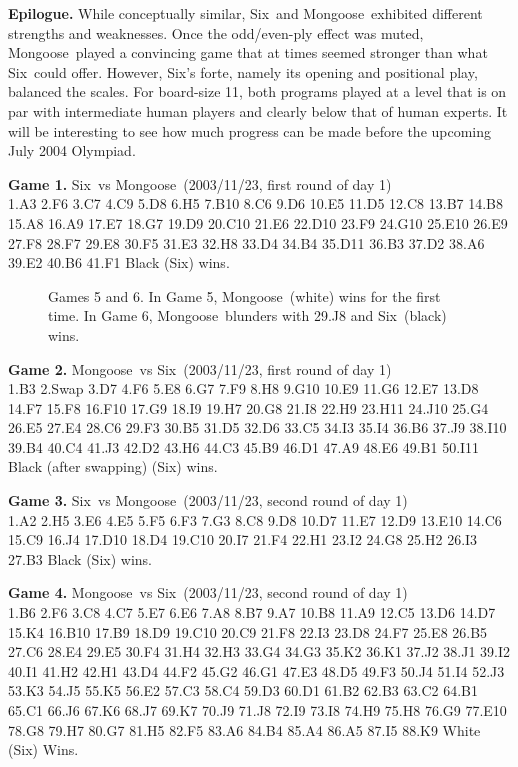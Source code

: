 \documentclass[12pt]{article}
\def\Six{{\sc Six}}
\def\Mg{{\sc Mongoose}}
\begin{document}
{\noindent\large\bf Epilogue.}
While conceptually similar, \Six\ and \Mg\ exhibited different
strengths and weaknesses. Once the odd/even-ply effect was muted,
\Mg\ played a convincing game that at times seemed stronger than what
\Six\ could offer. However, \Six's forte, 
namely its opening and positional play, balanced the scales. 
For board-size 11,
both programs played at a level that is on par with intermediate human players
and clearly below that of human experts.
It will be interesting to see how much progress can be made
before the upcoming July 2004 Olympiad.

{\footnotesize
\begin{trivlist}
\item[] 
{\bf Game 1.} \Six\ vs \Mg\ (2003/11/23, first round of day 1)\\
1.A3 2.F6 3.C7 4.C9 5.D8 6.H5 7.B10 8.C6 9.D6 10.E5
11.D5 12.C8 13.B7 14.B8 15.A8 16.A9 17.E7 18.G7 19.D9
20.C10 21.E6 22.D10 23.F9 24.G10 25.E10 26.E9 27.F8 28.F7
29.E8 30.F5 31.E3 32.H8 33.D4 34.B4 35.D11 36.B3 37.D2
38.A6 39.E2 40.B6 41.F1
Black (\Six) wins.

\begin{figure}\label{fig3}
\hspace*{-.2in}
\caption{Games 5 and 6.
In Game 5, \Mg\ (white) wins for the first time.
In Game 6, \Mg\ blunders with 29.J8 and \Six\ (black) wins.}
\end{figure}

\item[] {\bf Game 2.} \Mg\ vs \Six\ (2003/11/23, first round of day 1)\\
1.B3 2.Swap 3.D7 4.F6 5.E8 6.G7 7.F9 8.H8 9.G10 10.E9
11.G6 12.E7 13.D8 14.F7 15.F8 16.F10 17.G9 18.I9 19.H7
20.G8 21.I8 22.H9 23.H11 24.J10 25.G4 26.E5 27.E4 28.C6
29.F3 30.B5 31.D5 32.D6 33.C5 34.I3 35.I4 36.B6 37.J9
38.I10 39.B4 40.C4 41.J3 42.D2 43.H6 44.C3 45.B9 46.D1
47.A9 48.E6 49.B1 50.I11
Black (after swapping) (\Six) wins.

\item[] {\bf Game 3.} \Six\ vs \Mg\ (2003/11/23, second round of day 1)\\
1.A2 2.H5 3.E6 4.E5 5.F5 6.F3 7.G3 8.C8 9.D8 10.D7
11.E7 12.D9 13.E10 14.C6 15.C9 16.J4 17.D10 18.D4 19.C10
20.I7 21.F4 22.H1 23.I2 24.G8 25.H2 26.I3 27.B3
Black (\Six) wins.

\item[] {\bf Game 4.} \Mg\ vs \Six\ (2003/11/23, second round of day 1)\\
1.B6 2.F6 3.C8 4.C7 5.E7 6.E6 7.A8 8.B7 9.A7 10.B8
11.A9 12.C5 13.D6 14.D7 15.K4 16.B10 17.B9 18.D9 19.C10
20.C9 21.F8 22.I3 23.D8 24.F7 25.E8 26.B5 27.C6 28.E4 29.E5
30.F4 31.H4 32.H3 33.G4 34.G3 35.K2 36.K1 37.J2 38.J1 39.I2
40.I1 41.H2 42.H1 43.D4 44.F2 45.G2 46.G1 47.E3 48.D5 49.F3
50.J4 51.I4 52.J3 53.K3 54.J5 55.K5 56.E2 57.C3 58.C4 59.D3
60.D1 61.B2 62.B3 63.C2 64.B1 65.C1 66.J6 67.K6 68.J7 69.K7
70.J9 71.J8 72.I9 73.I8 74.H9 75.H8 76.G9 77.E10 78.G8
79.H7 80.G7 81.H5 82.F5 83.A6 84.B4 85.A4 86.A5 87.I5 88.K9
White (\Six) Wins.


\end{trivlist}}
\end{document}
